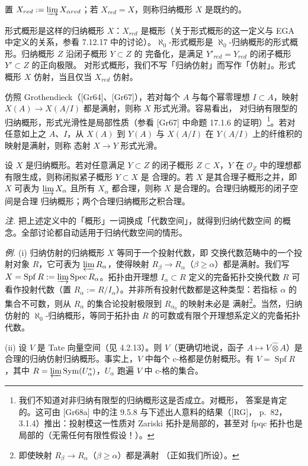 置 $X_{red}:=\varinjlim X_{\alpha red}$；若 $X_{red}=X$，则称归纳概形 $X$
是既约的。

形式概形是这样的归纳概形 $X$：$X_{red}$ 是概形（关于形式概形的这一定义与
EGA 中定义的关系，参看 7.12.17 中的讨论）。$\aleph_0$-形式概形是
$\aleph_0$-归纳概形的形式概形。归纳概形 $Z$ 沿闭子概形 $Y\subset Z$ 的
完备化，是满足 $Y'_{red}=Y_{red}$ 的闭子概形 $Y'\subset Z$ 的正向极限。
对形式概形，我们不写「归纳仿射」而写作「仿射」。形式概形 $X$ 仿射，当且仅当
$X_{red}$ 仿射。

仿照 Grothendieck（[Gr64]、[Gr67]），若对每个 $A$ 与每个幂零理想
$I\subset A$，映射 $X(A)\to X(A/I)$ 都是满射，则称 $X$ 形式光滑。容易看出，
对归纳有限型的归纳概形，形式光滑性是局部性质（参看 [Gr67] 中命题 17.1.6
的证明）\footnote{我们不知道对非归纳有限型的归纳概形这是否成立。对概形，
答案是肯定的。这可由 [Gr68a] 中的注 9.5.8 与下述出人意料的结果（[RG]，
p.~82，3.1.4）推出：投射模这一性质对 Zariski 拓扑是局部的，甚至对 fpqc
拓扑也是局部的（无需任何有限性假设！）。}。若对任意如上之 $A$、$I$，从
$X(A)$ 到 $Y(A)$ 与 $X(A/I)$ 在 $Y(A/I)$ 上的纤维积的映射是满射，则称
态射 $X\to Y$ 形式光滑。

设 $X$ 是归纳概形。若对任意满足 $Y\subset Z$ 的闭子概形 $Z\subset X$，$Y$
在 $\mathcal{O}_Z$ 中的理想都有限生成，则称闭拟紧子概形 $Y\subset X$ 是
合理的。若 $X$ 是其合理子概形之并，即 $X$ 可表为 $\varinjlim X_\alpha$
且所有 $X_\alpha$ 都合理，则称 $X$ 是合理的。合理归纳概形的闭子空间是合理
归纳概形；两个合理归纳概形之积合理。


\emph{注.} 把上述定义中的「概形」一词换成「代数空间」，就得到归纳代数空间
的概念。全部讨论都自动适用于归纳代数空间的情形。

 \emph{例.} (i) 归纳仿射的归纳概形 $X$ 等同于一个投射代数，即
交换代数范畴中的一个投射对象 $R$，它可表为 $\varprojlim R_\alpha$，使得映射
$R_\beta\to R_\alpha$（$\beta\ge\alpha$）都是满射。我们写
$X=\operatorname{Spf}R:=\varinjlim\operatorname{Spec}R_\alpha$。拓扑由开理想
$I_\alpha\subset R$ 定义的完备拓扑交换代数 $R$ 可看作投射代数（置
$R_\alpha:=R/I_\alpha$）。并非所有投射代数都是这种类型：若指标 $\alpha$ 的
集合不可数，则从 $R_\alpha$ 的集合论投射极限到 $R_{\alpha_0}$ 的映射未必是
满射\footnote{即使映射 $R_\beta\to R_\alpha$（$\beta\ge\alpha$）都是满射
（正如我们所设）。}。当然，归纳仿射的 $\aleph_0$-归纳概形，等同于拓扑由
$R$ 的可数或有限个开理想系定义的完备拓扑代数。

(ii) 设 $V$ 是 Tate 向量空间（见 4.2.13）。则 $V$（更确切地说，函子
$A\mapsto V\hat\otimes A$）是合理的归纳仿射归纳概形。事实上，$V$ 中每个
c-格都是仿射概形。有 $V=\operatorname{Spf}R$，其中
$R=\varprojlim\operatorname{Sym}(U_\alpha^*)$，$U_\alpha$ 跑遍 $V$ 中
c-格的集合。

